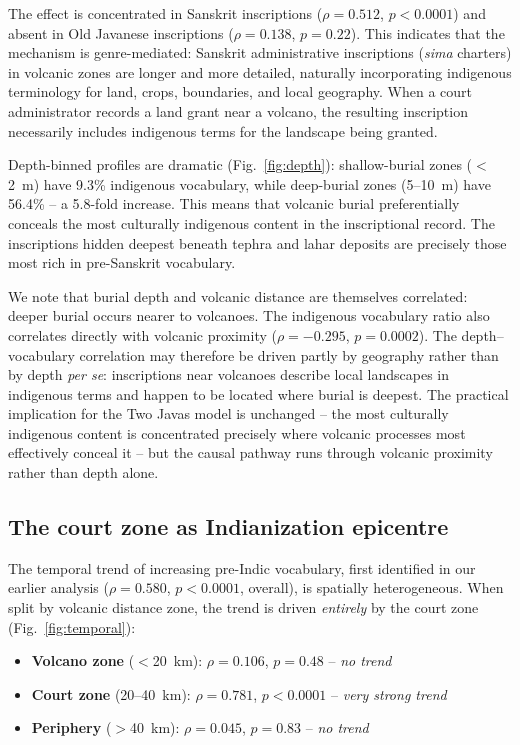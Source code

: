 \documentclass[12pt]{article}
\begin{document}
The effect is concentrated in Sanskrit inscriptions ($\rho = 0.512$, $p < 0.0001$) and absent in Old Javanese inscriptions ($\rho = 0.138$, $p = 0.22$).
This indicates that the mechanism is genre-mediated: Sanskrit administrative inscriptions (\textit{sima} charters) in volcanic zones are longer and more detailed, naturally incorporating indigenous terminology for land, crops, boundaries, and local geography.
When a court administrator records a land grant near a volcano, the resulting inscription necessarily includes indigenous terms for the landscape being granted.

Depth-binned profiles are dramatic (Fig.~\ref{fig:depth}): shallow-burial zones ($<$2~m) have 9.3\% indigenous vocabulary, while deep-burial zones (5--10~m) have 56.4\% -- a 5.8-fold increase.
This means that volcanic burial preferentially conceals the most culturally indigenous content in the inscriptional record.
The inscriptions hidden deepest beneath tephra and lahar deposits are precisely those most rich in pre-Sanskrit vocabulary.

We note that burial depth and volcanic distance are themselves correlated: deeper burial occurs nearer to volcanoes.
The indigenous vocabulary ratio also correlates directly with volcanic proximity ($\rho = -0.295$, $p = 0.0002$).
The depth--vocabulary correlation may therefore be driven partly by geography rather than by depth \textit{per se}: inscriptions near volcanoes describe local landscapes in indigenous terms and happen to be located where burial is deepest.
The practical implication for the Two Javas model is unchanged -- the most culturally indigenous content is concentrated precisely where volcanic processes most effectively conceal it -- but the causal pathway runs through volcanic proximity rather than depth alone.

\subsection{The court zone as Indianization epicentre}

The temporal trend of increasing pre-Indic vocabulary, first identified in our earlier analysis ($\rho = 0.580$, $p < 0.0001$, overall), is spatially heterogeneous.
When split by volcanic distance zone, the trend is driven \emph{entirely} by the court zone (Fig.~\ref{fig:temporal}):

\begin{itemize}
    \item \textbf{Volcano zone} ($<$20~km): $\rho = 0.106$, $p = 0.48$ -- \emph{no trend}
    \item \textbf{Court zone} (20--40~km): $\rho = 0.781$, $p < 0.0001$ -- \emph{very strong trend}
    \item \textbf{Periphery} ($>$40~km): $\rho = 0.045$, $p = 0.83$ -- \emph{no trend}
\end{itemize}
\end{document}
